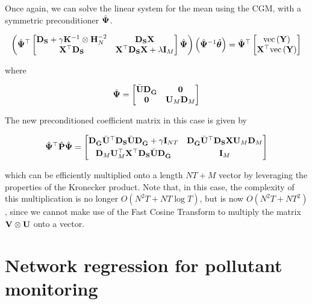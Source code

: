 Once again, we can solve the linear system for the mean using the CGM, with a symmetric preconditioner $\hat{\mathbf{\Psi}}$.  

\begin{equation}
    \left( \hat{\mathbf{\Psi}}^\top \begin{bmatrix}
        \mathbf{D}_{\mathbf{S}} + \gamma \mathbf{K}^{-1} \otimes \mathbf{H}_N^{-2} & \mathbf{D}_{\mathbf{S}}  \mathbf{X} \\
        \mathbf{X}^\top \mathbf{D}_{\mathbf{S}} & \mathbf{X}^\top \mathbf{D}_{\mathbf{S}} \mathbf{X} + \lambda \mathbf{I}_M   
       \end{bmatrix}  \hat{\mathbf{\Psi}} \right) \left( \hat{\mathbf{\Psi}}^{-1} \hat{\boldsymbol{\theta}}\right)   = \hat{\mathbf{\Psi}}^\top \begin{bmatrix} \text{\textup{vec}}\left(\mathbf{Y}\right) \\ \mathbf{X}^\top \text{\textup{vec}}\left(\mathbf{Y}\right) \end{bmatrix}
\end{equation}

where 

\begin{equation}
    \hat{\mathbf{\Psi}} =  \begin{bmatrix}
        \bar{\mathbf{U}} \mathbf{D}_{\bar{\mathbf{G}}} & \mathbf{0} \\
        \mathbf{0} & \mathbf{U}_M \mathbf{D}_M 
    \end{bmatrix}
\end{equation}

The new preconditioned coefficient matrix in this case is given by 

\begin{equation*}
    \hat{\mathbf{\Psi}}^\top \hat{\mathbf{P}}  \hat{\mathbf{\Psi}} = 
       \begin{bmatrix}
        \mathbf{D}_{\bar{\mathbf{G}}} \bar{\mathbf{U}}^\top \mathbf{D}_{\mathbf{S}} \bar{\mathbf{U}} \mathbf{D}_{\bar{\mathbf{G}}} + \gamma \mathbf{I}_{NT}  &  \mathbf{D}_{\bar{\mathbf{G}}} \bar{\mathbf{U}}^\top \mathbf{D}_{\mathbf{S}} \mathbf{X} \mathbf{U}_M \mathbf{D}_M \\[0.1cm] 
        \mathbf{D}_M \mathbf{U}_M^\top \mathbf{X}^\top \mathbf{D}_{\mathbf{S}} \bar{\mathbf{U}} \mathbf{D}_{\bar{\mathbf{G}}} & \mathbf{I}_M
        \end{bmatrix}
\end{equation*}

which can be efficiently multiplied onto a length $NT + M$ vector by leveraging the properties of the Kronecker product. Note that, in this case, the complexity of this multiplication is no longer $O(N^2T + NT \log T)$, but is now $O(N^2T + NT^2)$, since we cannot make use of the Fast Cosine Transform to multiply the matrix $\mathbf{V} \otimes \mathbf{U}$ onto a vector. 

\newpage

\section{Network regression for pollutant monitoring}

